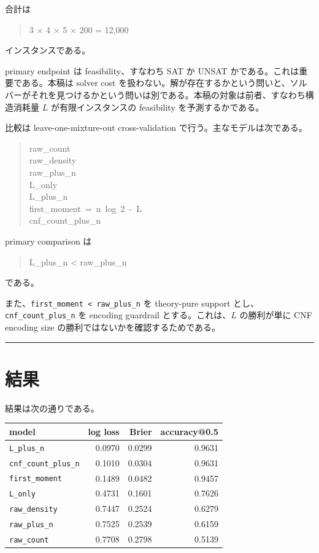 \documentclass[12pt,a4paper]{article}
\begin{document}
合計は

\begin{quote}
\small
3 × 4 × 5 × 200 = 12,000
\end{quote}

インスタンスである。

primary endpoint は feasibility、すなわち SAT か UNSAT かである。これは重要である。本稿は solver cost を扱わない。解が存在するかという問いと、ソルバーがそれを見つけるかという問いは別である。本稿の対象は前者、すなわち構造消耗量 $L$ が有限インスタンスの feasibility を予測するかである。

比較は leave-one-mixture-out cross-validation で行う。主なモデルは次である。

\begin{quote}
{\small\ttfamily\noindent
raw\_count \\raw\_density \\raw\_plus\_n \\L\_only \\L\_plus\_n \\first\_moment~=~n~log~2~-~L \\cnf\_count\_plus\_n
}
\end{quote}

primary comparison は

\begin{quote}
\small
L\_plus\_n < raw\_plus\_n
\end{quote}

である。

また、\texttt{first\_moment\ \textless{}\ raw\_plus\_n} を theory-pure support とし、\texttt{cnf\_count\_plus\_n} を encoding guardrail とする。これは、$L$ の勝利が単に CNF encoding size の勝利ではないかを確認するためである。

\begin{center}\rule{0.5\linewidth}{0.5pt}\end{center}

\section{結果}\label{ux7d50ux679c}

結果は次の通りである。

{\def\LTcaptype{table} %
\begin{longtable}[]{@{}lrrr@{}}
\toprule\noalign{}
model & log loss & Brier & accuracy@0.5 \\
\midrule\noalign{}
\endhead
\bottomrule\noalign{}
\endlastfoot
\texttt{L\_plus\_n} & 0.0970 & 0.0299 & 0.9631 \\
\texttt{cnf\_count\_plus\_n} & 0.1010 & 0.0304 & 0.9631 \\
\texttt{first\_moment} & 0.1489 & 0.0482 & 0.9457 \\
\texttt{L\_only} & 0.4731 & 0.1601 & 0.7626 \\
\texttt{raw\_density} & 0.7447 & 0.2524 & 0.6279 \\
\texttt{raw\_plus\_n} & 0.7525 & 0.2539 & 0.6159 \\
\texttt{raw\_count} & 0.7708 & 0.2798 & 0.5139 \\
\end{longtable}
}
\end{document}
